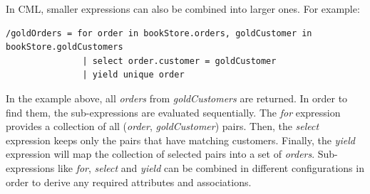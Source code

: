 In CML, smaller expressions can also be combined into larger ones. For example:

\verbatimfont{\scriptsize}
\begin{verbatim}
/goldOrders = for order in bookStore.orders, goldCustomer in bookStore.goldCustomers
               | select order.customer = goldCustomer
               | yield unique order
 \end{verbatim}

In the example above, all \emph{orders} from \emph{goldCustomers} are returned.
In order to find them, the sub-expressions are evaluated sequentially.
The \emph{for} expression provides a collection of all (\emph{order}, \emph{goldCustomer}) pairs.
Then, the \emph{select} expression keeps only the pairs that have matching customers.
Finally, the \emph{yield} expression will map the collection of selected pairs into a set of \emph{orders}.
Sub-expressions like \emph{for}, \emph{select} and \emph{yield} can be combined in different configurations
in order to derive any required attributes and associations.
